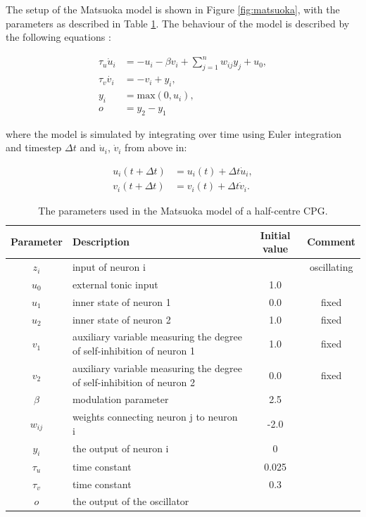 The setup of the Matsuoka model is shown in Figure \ref{fig:matsuoka}, with the parameters as described in Table \ref{tab:parameters}. The behaviour of the model is described by the following equations \cite{CPGequations}:

\begin{align}
    \tau_u \dot{u}_i &= -u_i - \beta v_i + \sum^{n}_{j=1} w_{ij}y_j + u_0, \\
    \tau_v \dot{v_i} &= -v_i + y_i, \\
    y_i &= \text{max}(0, u_i), \\
    o &= y_2 - y_1
\end{align}

where the model is simulated by integrating over time using Euler integration and timestep $\Delta t$ and $\dot{u}_i$, $\dot{v}_i$ from above in:

\begin{align}
    u_i(t + \Delta t) &= u_i(t) + \Delta t \dot{u}_i, \\
    v_i(t + \Delta t) &= v_i(t) + \Delta t \dot{v}_i.
\end{align}

\begin{table}[htbp]
    \centering
    \begin{tabular}{|c|p{6.5cm}|c|c|}
         \hline
\textbf{Parameter} & \textbf{Description} & \textbf{Initial value} & \textbf{Comment} \\ \hline
$z_i$ & input of neuron i &  & oscillating  \\ \hline
$u_0$ & external tonic input & 1.0 &  \\ \hline
$u_1$ & inner state of neuron 1 & 0.0 & fixed \\ \hline
$u_2$ & inner state of neuron 2 & 1.0 & fixed \\ \hline
$v_1$ & auxiliary variable measuring the degree of self-inhibition of neuron 1 & 1.0 & fixed \\ \hline
$v_2$ & auxiliary variable measuring the degree of self-inhibition of neuron 2 & 0.0 & fixed \\ \hline
$\beta$ & modulation parameter & 2.5 &  \\ \hline
$w_{ij}$ & weights connecting neuron j to neuron i & -2.0 &  \\ \hline
$y_i$ & the output of neuron i & 0 & \\ \hline
$\tau_u$ & time constant & 0.025 &  \\ \hline
$\tau_v$ & time constant & 0.3 &  \\ \hline
$o$ & the output of the oscillator & & \\ \hline
    \end{tabular}
    \caption{The parameters used in the Matsuoka model of a half-centre CPG.}
    \label{tab:parameters}
\end{table}


